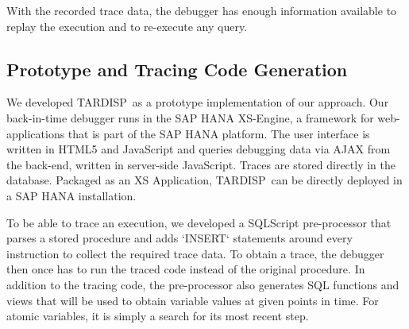 \documentclass[english,conference,final]{IEEEtran}
\newcommand{\todo}[2][]{\pdfmargincomment[author={#1}]{#2}}
\newcommand{\tool}{TAR\-DISP}
\begin{document}
With the recorded trace data, the debugger has enough information available to replay the execution and to re-execute any query.
%
%
%


\subsection{Prototype and Tracing Code Generation}

We developed \tool\ as a prototype implementation of our approach.
Our back-in-time debugger runs in the SAP HANA XS-Engine, a framework for web-applications that is part of the SAP HANA platform.
The user interface is written in HTML5 and JavaScript and queries debugging data via AJAX from the back-end, written in server-side JavaScript.
Traces are stored directly in the database.
Packaged as an XS Application, \tool\ can be directly deployed in a SAP HANA installation.


To be able to trace an execution, we developed a SQLScript pre-processor that parses a stored procedure and adds `INSERT` statements around every instruction to collect the required trace data.
To obtain a trace, the debugger then once has to run the traced code instead of the original procedure.
In addition to the tracing code, the pre-processor also generates SQL functions and views that will be used to obtain variable values at given points in time.
For atomic variables, it is simply a search for its most recent step.
\end{document}
